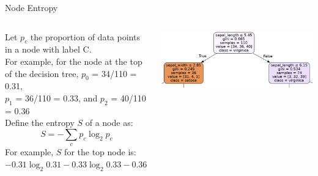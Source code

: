 \documentclass[aspectratio=169]{../latex_main/tntbeamer}  %
\begin{document}
	\begin{frame}{Node Entropy}
	
	    \vspace{-2em}
	    \begin{columns}
	        \begin{column}{.5\textwidth}
	        
	                Let $p_c$ the proportion of data points in a node with label C.\\
	                \bigskip
	                For example, for the node at the top of the decision tree, $p_0$ = 34/110 = 0.31,\\
                    $p_1$ = 36/110 = 0.33, and $p_2$ = 40/110 = 0.36\\
                    \bigskip
                    Define the entropy $S$ of a node as:
                    \begin{equation*}
                        S = -\sum\limits_c p_c\log_2p_c
                    \end{equation*}
                    For example, $S$ for the top node is:
                    $-0.31 \log_2  0.31 - 0.33 \log_2 0.33 - 0.36 \log_2 0.36 = 0.52 + 0.53 + 0.53 = 1.58$
                    
	        \end{column}
	        
	        \begin{column}{.5\textwidth}

	                    \centering
	                    \includegraphics[scale=.5]{Bild47}
	                    
	        \end{column}
	    \end{columns}
	\end{frame}
	
	
	
\end{document}
